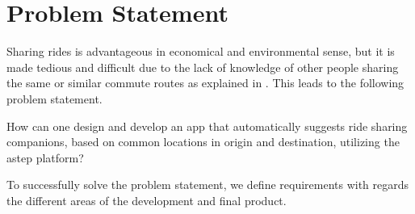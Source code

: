 \section{Problem Statement}\label{sec:probstat}
Sharing rides is advantageous in economical and environmental sense, but it is made tedious and difficult due to the lack of knowledge of other people sharing the same or similar commute routes as explained in \cite{doi:10.1080/01441647.2011.621557}. This leads to the following problem statement.

{\addtolength{\leftskip}{10mm}\addtolength{\rightskip}{10mm}\noindent\hrulefill\it

\noindent How can one design and develop an app that automatically suggests ride sharing companions, based on common locations in origin and destination, utilizing the \gls{astep} platform? 

\noindent\hrulefill

}

To successfully solve the problem statement, we  define requirements with regards the different areas of the development and final product.
